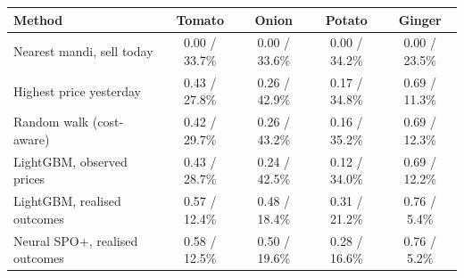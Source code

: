 \renewcommand{\arraystretch}{1.25}
\footnotesize
\begin{tabular}{|l|c|c|c|c|}
\hline
\textbf{Method} & \textbf{Tomato} & \textbf{Onion} & \textbf{Potato} & \textbf{Ginger} \\
\hline
Nearest mandi, sell today & 0.00 / 33.7\% & 0.00 / 33.6\% & 0.00 / 34.2\% & 0.00 / 23.5\% \\
\hline
Highest price yesterday & 0.43 / 27.8\% & 0.26 / 42.9\% & 0.17 / 34.8\% & 0.69 / 11.3\% \\
\hline
Random walk (cost-aware) & 0.42 / 29.7\% & 0.26 / 43.2\% & 0.16 / 35.2\% & 0.69 / 12.3\% \\
\hline
LightGBM, observed prices & 0.43 / 28.7\% & 0.24 / 42.5\% & 0.12 / 34.0\% & 0.69 / 12.2\% \\
\hline
LightGBM, realised outcomes & 0.57 / 12.4\% & 0.48 / 18.4\% & 0.31 / 21.2\% & 0.76 / 5.4\% \\
\hline
Neural SPO+, realised outcomes & 0.58 / 12.5\% & 0.50 / 19.6\% & 0.28 / 16.6\% & 0.76 / 5.2\% \\
\hline
\end{tabular}
